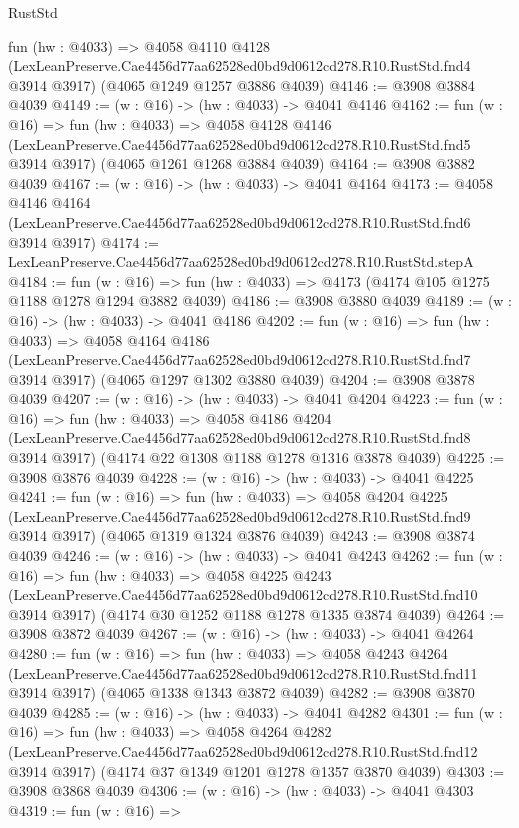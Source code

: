 \begin{lexlean}{RustStd}
\begin{coremodule}
  fun (hw : @4033) =>
  @4058
    @4110
    @4128
    (LexLeanPreserve.Cae4456d77aa62528ed0bd9d0612cd278.R10.RustStd.fnd4 @3914 @3917)
    (@4065 @1249 @1257 @3886 @4039)
@4146 := @3908 @3884 @4039
@4149 := (w : @16) -> (hw : @4033) -> @4041 @4146
@4162 := fun (w : @16) =>
  fun (hw : @4033) =>
  @4058
    @4128
    @4146
    (LexLeanPreserve.Cae4456d77aa62528ed0bd9d0612cd278.R10.RustStd.fnd5 @3914 @3917)
    (@4065 @1261 @1268 @3884 @4039)
@4164 := @3908 @3882 @4039
@4167 := (w : @16) -> (hw : @4033) -> @4041 @4164
@4173 := @4058
    @4146
    @4164
    (LexLeanPreserve.Cae4456d77aa62528ed0bd9d0612cd278.R10.RustStd.fnd6 @3914 @3917)
@4174 := LexLeanPreserve.Cae4456d77aa62528ed0bd9d0612cd278.R10.RustStd.stepA
@4184 := fun (w : @16) => fun (hw : @4033) => @4173 (@4174 @105 @1275 @1188 @1278 @1294 @3882 @4039)
@4186 := @3908 @3880 @4039
@4189 := (w : @16) -> (hw : @4033) -> @4041 @4186
@4202 := fun (w : @16) =>
  fun (hw : @4033) =>
  @4058
    @4164
    @4186
    (LexLeanPreserve.Cae4456d77aa62528ed0bd9d0612cd278.R10.RustStd.fnd7 @3914 @3917)
    (@4065 @1297 @1302 @3880 @4039)
@4204 := @3908 @3878 @4039
@4207 := (w : @16) -> (hw : @4033) -> @4041 @4204
@4223 := fun (w : @16) =>
  fun (hw : @4033) =>
  @4058
    @4186
    @4204
    (LexLeanPreserve.Cae4456d77aa62528ed0bd9d0612cd278.R10.RustStd.fnd8 @3914 @3917)
    (@4174 @22 @1308 @1188 @1278 @1316 @3878 @4039)
@4225 := @3908 @3876 @4039
@4228 := (w : @16) -> (hw : @4033) -> @4041 @4225
@4241 := fun (w : @16) =>
  fun (hw : @4033) =>
  @4058
    @4204
    @4225
    (LexLeanPreserve.Cae4456d77aa62528ed0bd9d0612cd278.R10.RustStd.fnd9 @3914 @3917)
    (@4065 @1319 @1324 @3876 @4039)
@4243 := @3908 @3874 @4039
@4246 := (w : @16) -> (hw : @4033) -> @4041 @4243
@4262 := fun (w : @16) =>
  fun (hw : @4033) =>
  @4058
    @4225
    @4243
    (LexLeanPreserve.Cae4456d77aa62528ed0bd9d0612cd278.R10.RustStd.fnd10 @3914 @3917)
    (@4174 @30 @1252 @1188 @1278 @1335 @3874 @4039)
@4264 := @3908 @3872 @4039
@4267 := (w : @16) -> (hw : @4033) -> @4041 @4264
@4280 := fun (w : @16) =>
  fun (hw : @4033) =>
  @4058
    @4243
    @4264
    (LexLeanPreserve.Cae4456d77aa62528ed0bd9d0612cd278.R10.RustStd.fnd11 @3914 @3917)
    (@4065 @1338 @1343 @3872 @4039)
@4282 := @3908 @3870 @4039
@4285 := (w : @16) -> (hw : @4033) -> @4041 @4282
@4301 := fun (w : @16) =>
  fun (hw : @4033) =>
  @4058
    @4264
    @4282
    (LexLeanPreserve.Cae4456d77aa62528ed0bd9d0612cd278.R10.RustStd.fnd12 @3914 @3917)
    (@4174 @37 @1349 @1201 @1278 @1357 @3870 @4039)
@4303 := @3908 @3868 @4039
@4306 := (w : @16) -> (hw : @4033) -> @4041 @4303
@4319 := fun (w : @16) =>

\end{coremodule}
\end{lexlean}
